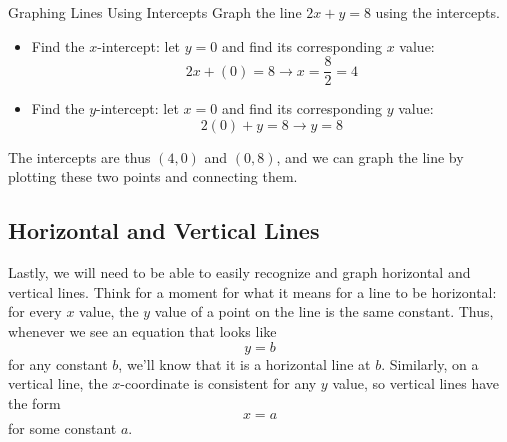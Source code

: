 \begin{example}[https://www.youtube.com/watch?v=SkjLSvZBe0g]{Graphing Lines Using Intercepts}
Graph the line $2x+y=8$ using the intercepts.\\

\sol
\begin{itemize}
\item Find the $x$-intercept: let $y=0$ and find its corresponding $x$ value:
\[2x+(0)=8 \longrightarrow x=\dfrac{8}{2}=4\]
\item Find the $y$-intercept: let $x=0$ and find its corresponding $y$ value:
\[2(0)+y=8 \longrightarrow y=8\]
\end{itemize}

The intercepts are thus $(4,0)$ and $(0,8)$, and we can graph the line by plotting these two points and connecting them.
\begin{center}
\end{center}
\end{example}
\vfill
\pagebreak

\subsection{Horizontal and Vertical Lines}
Lastly, we will need to be able to easily recognize and graph horizontal and vertical lines.  Think for a moment for what it means for a line to be horizontal: for every $x$ value, the $y$ value of a point on the line is the same constant.  Thus, whenever we see an equation that looks like \[y=b\] for any constant $b$, we'll know that it is a horizontal line at $b$.  Similarly, on a vertical line, the $x$-coordinate is consistent for any $y$ value, so vertical lines have the form \[x=a\] for some constant $a$.


